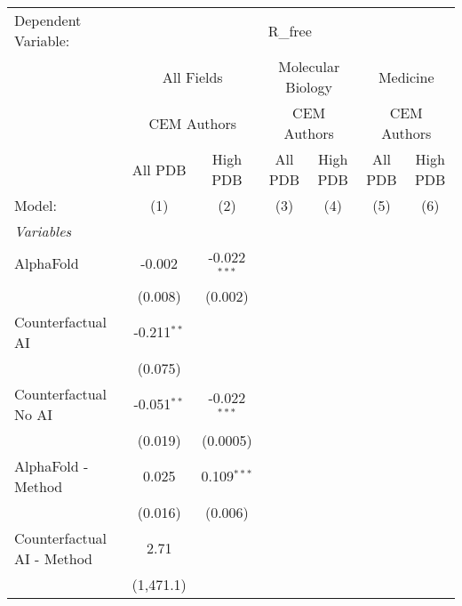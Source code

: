 \begingroup
\centering
\begin{tabular}{lcccccc}
   \tabularnewline \midrule \midrule
   Dependent Variable: & \multicolumn{6}{c}{R\_free}\\
 & \multicolumn{2}{c}{All Fields} & \multicolumn{2}{c}{Molecular Biology} & \multicolumn{2}{c}{Medicine} \\
\cmidrule(lr){2-3} \cmidrule(lr){4-5} \cmidrule(lr){6-7}
 & \multicolumn{2}{c}{CEM Authors} & \multicolumn{2}{c}{CEM Authors} & \multicolumn{2}{c}{CEM Authors} \\
\cmidrule(lr){2-3} \cmidrule(lr){4-5} \cmidrule(lr){6-7}
 & \multicolumn{1}{c}{All PDB} & \multicolumn{1}{c}{High PDB} & \multicolumn{1}{c}{All PDB} & \multicolumn{1}{c}{High PDB} & \multicolumn{1}{c}{All PDB} & \multicolumn{1}{c}{High PDB} \\
\cmidrule(lr){2-2} \cmidrule(lr){3-3} \cmidrule(lr){4-4} \cmidrule(lr){5-5} \cmidrule(lr){6-6} \cmidrule(lr){7-7}
   Model:                                   & (1)           & (2)            & (3) & (4) & (5) & (6)\\  
   \midrule
   \emph{Variables}\\
   AlphaFold                                & -0.002        & -0.022$^{***}$ &     &     &     &   \\   
                                            & (0.008)       & (0.002)        &     &     &     &   \\   
   Counterfactual AI                        & -0.211$^{**}$ &                &     &     &     &   \\   
                                            & (0.075)       &                &     &     &     &   \\   
   Counterfactual No AI                     & -0.051$^{**}$ & -0.022$^{***}$ &     &     &     &   \\   
                                            & (0.019)       & (0.0005)       &     &     &     &   \\   
   AlphaFold - Method                       & 0.025         & 0.109$^{***}$  &     &     &     &   \\   
                                            & (0.016)       & (0.006)        &     &     &     &   \\   
   Counterfactual AI - Method               & 2.71          &                &     &     &     &   \\   
                                            & (1,471.1)     &                &     &     &     &   \\   

\end{tabular}
